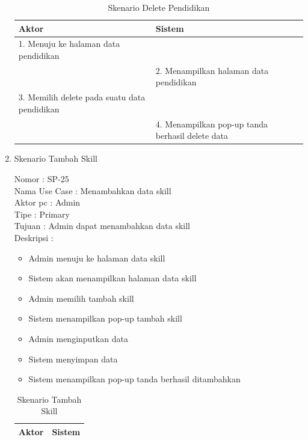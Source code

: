 \begin{enumerate}
\begin{itemize}
\end{itemize}

\begin{table}
	\caption{Skenario Delete Pendidikan}
	\centering
	\begin{tabular}{ | p{55mm} | p{70mm}|}
		\hline 
		\textbf{Aktor} & \textbf{Sistem} \\
		\hline
		
		1.	Menuju ke halaman data pendidikan &  \\
		
		\hline
		
		&  2.	Menampilkan halaman data pendidikan \\
		
		\hline
		
		3. Memilih delete pada suatu data pendidikan & \\
		
		\hline
		
		& 4.	Menampilkan pop-up tanda berhasil delete data \\
		\hline
		
	\end{tabular}
\end{table}

\item Skenario Tambah Skill

Nomor \kern 3.6pc : SP-25 \\
Nama Use Case : Menambahkan data skill \\
Aktor  pc : Admin \\
Tipe \kern 4.6pc : Primary \\
Tujuan \kern 3.6pc : Admin dapat menambahkan data skill \\
Deskripsi \kern 2.5pc : 

\begin{itemize}
	\item Admin menuju ke halaman data skill
	\item Sistem akan menampilkan halaman data skill
	\item Admin memilih tambah skill
	\item Sistem menampilkan pop-up tambah skill
	\item Admin menginputkan data
	\item Sistem menyimpan data
	\item Sistem menampilkan pop-up tanda berhasil ditambahkan
	
\end{itemize}

\begin{table}
	\caption{Skenario Tambah Skill}
	\centering
	\begin{tabular}{ | l | p{65mm} |}
		\hline 
		\textbf{Aktor} & \textbf{Sistem} \\
		\hline
		

\end{tabular}
\end{table}
\end{enumerate}
